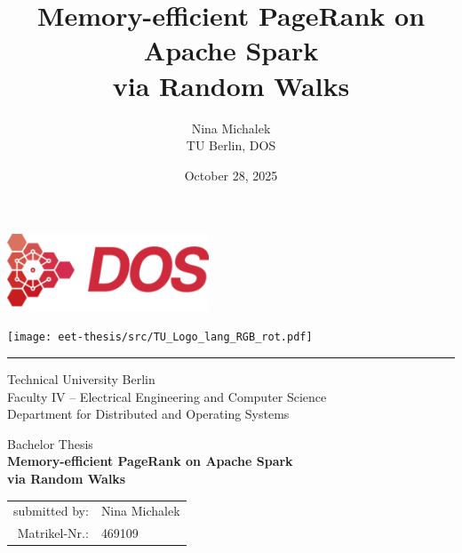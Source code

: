 \documentclass[a4paper,12pt]{article}
\title{Memory-efficient PageRank on Apache Spark\\ via Random Walks}
\author{Nina Michalek \\ TU Berlin, DOS}
\date{October 28, 2025}
\begin{document}
\begin{titlepage}
\setlength{\parindent}{0pt}

\noindent
\begin{minipage}[t]{0.5\textwidth}
  \includegraphics[width=0.45\textwidth]{images/Logo_dos.png}
\end{minipage}%
\begin{minipage}[t]{0.5\textwidth}
  \raggedleft
  \texttt{[image: eet-thesis/src/TU\_Logo\_lang\_RGB\_rot.pdf]}
\end{minipage}

\vspace{8mm}

\hrule   %
\vspace{10mm}

{\raggedright
Technical University Berlin\\
Faculty IV -- Electrical Engineering and Computer Science\\
Department for Distributed and Operating Systems\par
}

\vspace{15mm}

\begin{center}
\Large Bachelor Thesis\\[15mm]
\Huge \textbf{Memory-efficient PageRank on Apache Spark\\ via Random Walks}
\end{center}

\vspace{10mm}

\begin{center}
\begin{tabular}{rl}
submitted by: & Nina Michalek \\
Matrikel-Nr.: & 469109 \\
\end{tabular}
\end{center}

\vspace{8mm}


\end{titlepage}
\end{document}
